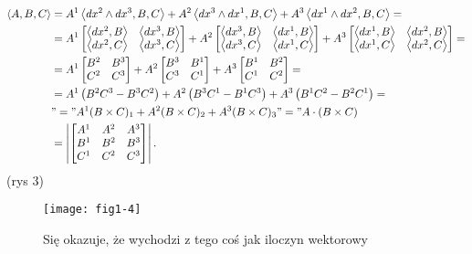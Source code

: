 \documentclass[../main.tex]{subfiles}
\begin{document}
\begin{align*}
    \left<A, B, C \right> &= A^1 \left<dx^2\land dx^3, B, C \right> + A^2\left<dx^3\land dx^1, B, C \right> + A^3 \left<dx^1\land dx^2, B, C \right> = \\
    &= A^1 \begin{bmatrix} \left<dx^2, B \right>& \left<dx^3, B \right>\\ \left<dx^2, C \right>& \left<dx^3, C \right> \end{bmatrix} + A^2 \begin{bmatrix} \left<dx^3, B \right> & \left<dx^1, B \right> \\ \left<dx^3, C \right> & \left<dx^1, C \right> \end{bmatrix} + A^3\begin{bmatrix} \left<dx^1, B \right> & \left<dx^2, B \right> \\ \left<dx^1, C \right> & \left<dx^2, C \right> \end{bmatrix}  =\\
        &= A^1\begin{bmatrix} B^2&B^3\\C^2&C^3 \end{bmatrix} + A^2\begin{bmatrix} B^3&B^1\\C^3&C^1 \end{bmatrix} + A^3\begin{bmatrix} B^1&B^2\\C^1&C^2 \end{bmatrix} =\\
            &=  A^1 \left( B^2C^3 - B^3C^2 \right) + A^2 \left( B^3C^1 - B^1C^3 \right) + A^3 \left( B^1C^2 - B^2C^1 \right) =\\
            &"=" A^1 (B\times C)_1 + A^2(B\times C)_2 + A^3(B\times C)_3 "=" A\cdot (B\times C) \\
            &= \left|\begin{bmatrix} A^1 & A^2 & A^3\\ B^1&B^2&B^3\\ C^1&C^2&C^3 \end{bmatrix}\right|
.\end{align*}
(rys 3)\\
\begin{figure}[h]
    \centering
    \texttt{[image: fig1-4]}
    \caption{Się okazuje, że wychodzi z tego coś jak iloczyn wektorowy}
    \label{fig:fig1-4}
\end{figure}
\end{document}
